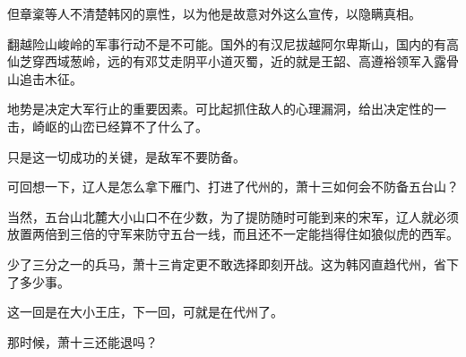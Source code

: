 但章楶等人不清楚韩冈的禀性，以为他是故意对外这么宣传，以隐瞒真相。

翻越险山峻岭的军事行动不是不可能。国外的有汉尼拔越阿尔卑斯山，国内的有高仙芝穿西域葱岭，远的有邓艾走阴平小道灭蜀，近的就是王韶、高遵裕领军入露骨山追击木征。

地势是决定大军行止的重要因素。可比起抓住敌人的心理漏洞，给出决定性的一击，崎岖的山峦已经算不了什么了。

只是这一切成功的关键，是敌军不要防备。

可回想一下，辽人是怎么拿下雁门、打进了代州的，萧十三如何会不防备五台山？

当然，五台山北麓大小山口不在少数，为了提防随时可能到来的宋军，辽人就必须放置两倍到三倍的守军来防守五台一线，而且还不一定能挡得住如狼似虎的西军。

少了三分之一的兵马，萧十三肯定更不敢选择即刻开战。这为韩冈直趋代州，省下了多少事。

这一回是在大小王庄，下一回，可就是在代州了。

那时候，萧十三还能退吗？
